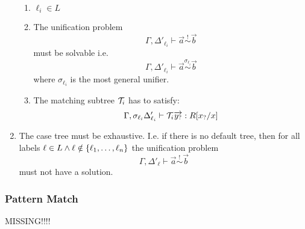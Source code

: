 \begin{enumerate}
\begin{enumerate}
            \item $\ell_i \in L$


            \item The unification problem
                $$
                \Gamma, \Delta'_{\ell_i}
                \vdash
                \vec a \stackrel ! \sim \vec b
                $$
                must be solvable i.e.
                $$
                \Gamma, \Delta'_{\ell_i}
                \vdash
                \vec a \stackrel {\sigma_{\ell_i}} \sim \vec b
                $$
                where $\sigma_{\ell_i}$ is the most general unifier.

            \item The matching subtree ${\mathcal T}_i$ has to satisfy:
                $$
                \Gamma, \sigma_{\ell_i} \Delta'_{\ell_i}
                \vdash
                {\mathcal T}_i {\overrightarrow {{y_?}}}
                :
                R[{x_?} / x]
                $$

        \end{enumerate}


    \item The case tree must be exhaustive. I.e. if there is no default tree,
        then for all labels
        $
            \ell \in L
            \land
            \ell \notin {\{\ell_1, \ldots, \ell_n\}}
        $
        the unification problem
        $$
        \Gamma, \Delta'_\ell
        \vdash
        \vec a \stackrel ! \sim \vec b
        $$
        must not have a solution.
\end{enumerate}






\subsubsection{Pattern Match}


MISSING!!!!
